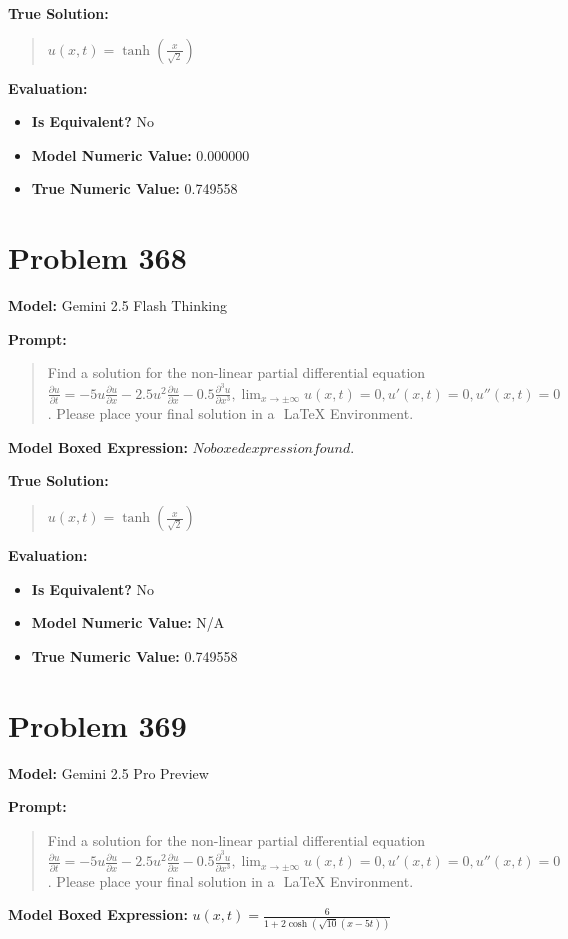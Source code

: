 \documentclass{article}
\begin{document}
{\textbf{True Solution:}
\begin{quote}
$u(x, t) = \tanh\left( \frac{x }{\sqrt{2}} \right)$
\end{quote}

\textbf{Evaluation:}
\begin{itemize}
\item \textbf{Is Equivalent?} No
\item \textbf{Model Numeric Value:} 0.000000
\item \textbf{True Numeric Value:} 0.749558
\end{itemize}
\vspace{1cm}
\section*{Problem 368}
\textbf{Model:} Gemini 2.5 Flash Thinking

\textbf{Prompt:}
\begin{quote}
Find a solution for the non-linear partial differential equation $\frac{\partial u}{\partial t} = -5u\frac{\partial u}{\partial x} -2.5u^2\frac{\partial u}{\partial x} - 0.5\frac{\partial^3 u}{\partial x^3},\lim_{x \to \pm \infty} u(x,t) = 0,u'(x,t) = 0,u''(x,t) = 0$. Please place your final solution in a $\boxed{}$ LaTeX Environment.
\end{quote}
\textbf{Model Boxed Expression:} $No boxed expression found.$

\textbf{True Solution:}
\begin{quote}
$u(x, t) = \tanh\left( \frac{x }{\sqrt{2}} \right)$
\end{quote}

\textbf{Evaluation:}
\begin{itemize}
\item \textbf{Is Equivalent?} No
\item \textbf{Model Numeric Value:} N/A
\item \textbf{True Numeric Value:} 0.749558
\end{itemize}
\vspace{1cm}
\section*{Problem 369}
\textbf{Model:} Gemini 2.5 Pro Preview

\textbf{Prompt:}
\begin{quote}
Find a solution for the non-linear partial differential equation $\frac{\partial u}{\partial t} = -5u\frac{\partial u}{\partial x} -2.5u^2\frac{\partial u}{\partial x} - 0.5\frac{\partial^3 u}{\partial x^3},\lim_{x \to \pm \infty} u(x,t) = 0,u'(x,t) = 0,u''(x,t) = 0$. Please place your final solution in a $\boxed{}$ LaTeX Environment.
\end{quote}
\textbf{Model Boxed Expression:} $u(x,t) = \frac{6}{1+2\cosh(\sqrt{10}(x-5t))}$

}
\end{document}
